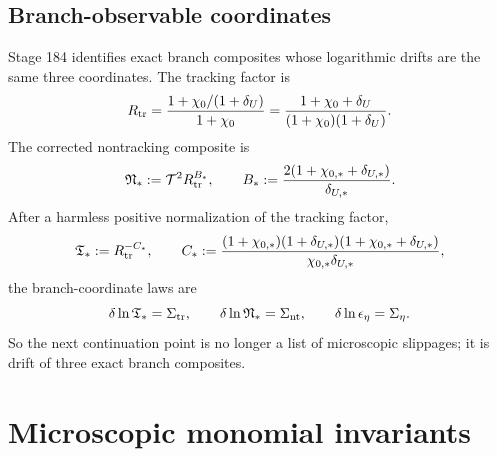 \subsection{Branch-observable coordinates}
Stage 184 identifies exact branch composites whose logarithmic drifts are the same three coordinates.  The tracking factor is
\begin{equation}
\label{eq:app-part05-Rtr-def}
R_{\rm tr}
=
\frac{1+\chi_0/(1+\delta_U)}{1+\chi_0}
=
\frac{1+\chi_0+\delta_U}{(1+\chi_0)(1+\delta_U)}.
\end{equation}
The corrected nontracking composite is
\begin{equation}
\label{eq:app-part05-Nstar-def}
\mathfrak N_*:=\mathcal T^2R_{\rm tr}^{B_*},
\qquad
B_*:=\frac{2(1+\chi_{0,*}+\delta_{U,*})}{\delta_{U,*}}.
\end{equation}
After a harmless positive normalization of the tracking factor,
\begin{equation}
\label{eq:app-part05-Tstar-def}
\mathfrak T_*:=R_{\rm tr}^{-C_*},
\qquad
C_*:=\frac{(1+\chi_{0,*})(1+\delta_{U,*})(1+\chi_{0,*}+\delta_{U,*})}{\chi_{0,*}\delta_{U,*}},
\end{equation}
the branch-coordinate laws are
\begin{equation}
\label{eq:app-part05-branch-coordinate-laws}
\delta\ln\mathfrak T_* = \Sigma_{\rm tr},
\qquad
\delta\ln\mathfrak N_* = \Sigma_{\rm nt},
\qquad
\delta\ln\epsilon_\eta=\Sigma_\eta.
\end{equation}
So the next continuation point is no longer a list of microscopic slippages; it is drift of three exact branch composites.


\section{Microscopic monomial invariants}
\label{sec:app-part05_weak_axisymmetric_orbit:microscopic-monomial-invariants}

